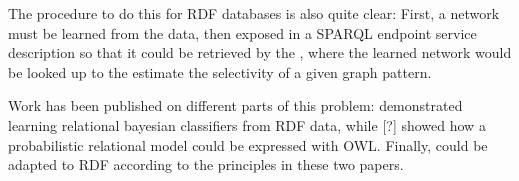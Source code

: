 The procedure to do this for RDF databases is also quite clear: First,
a network must be learned from the data, then exposed in a SPARQL
endpoint service description so that it could be retrieved by the
\fedeng{}, where the learned network would be looked up to the
estimate the selectivity of a given graph pattern.

Work has been published on different parts of this problem:
\cite{Lin:2011:LRB:2063016.2063042} demonstrated learning relational
bayesian classifiers from RDF data, while [?] 
showed how a probabilistic  relational model could be expressed with
OWL. Finally,  \cite{selectivityPRM} could be adapted to RDF according
to the principles in these two papers.